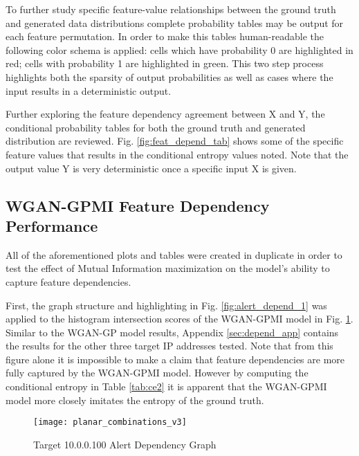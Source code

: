 To further study specific feature-value relationships between the ground truth and generated data distributions complete probability tables may be output for each feature permutation. In order to make this tables human-readable the following color schema is applied: cells which have probability 0 are highlighted in red; cells with probability 1 are highlighted in green. This two step process highlights both the sparsity of output probabilities as well as cases where the input results in a deterministic output.

Further exploring the feature dependency agreement between X and Y, the conditional probability tables for both the ground truth and generated distribution are reviewed. Fig. \ref{fig:feat_depend_tab} shows some of the specific feature values that results in the conditional entropy values noted. Note that the output value Y is very deterministic once a specific input X is given.



\subsection{WGAN-GPMI Feature Dependency Performance}

All of the aforementioned plots and tables were created in duplicate in order to test the effect of Mutual Information maximization on the model's ability to capture feature dependencies.

First, the graph structure and highlighting in Fig. \ref{fig:alert_depend_1} was applied to the histogram intersection scores of the WGAN-GPMI model in Fig. \ref{fig:alert_depend_5}. Similar to the WGAN-GP model results, Appendix \ref{sec:depend_app} contains the results for the other three target IP addresses tested. Note that from this figure alone it is impossible to make a claim that feature dependencies are more fully captured by the WGAN-GPMI model. However by computing the conditional entropy in Table \ref{tab:ce2} it is apparent that the WGAN-GPMI model more closely imitates the entropy of the ground truth.

\begin{figure}[!htbp]
	\centering
	\texttt{[image: planar\_combinations\_v3]}
	\caption{
		Target 10.0.0.100 Alert Dependency Graph
	}
	\label{fig:alert_depend_5}
\end{figure}


